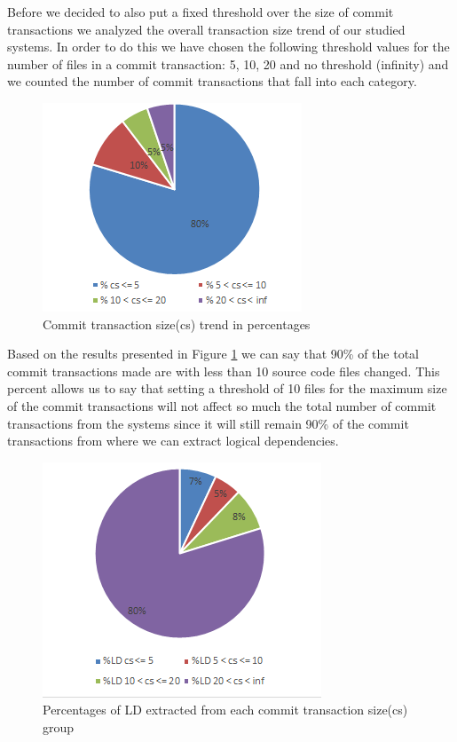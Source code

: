 \documentclass[conference]{IEEEtran}
\begin{document}
Before we decided to also put a fixed threshold over the size of commit transactions we analyzed the overall transaction size trend of our studied systems.
In order to do this we have chosen the following threshold values for the number of files in a commit transaction: 5, 10, 20 and no threshold (infinity) and we counted the number of commit transactions that fall into each category.


\begin{figure}[h]
\includegraphics[scale=0.9]{fig_cs.png}
\caption{Commit transaction size(cs) trend in percentages}
\label{fig:fig_cs}
\centering
\end{figure}


Based on the results presented in Figure \ref{fig:fig_cs} we can say that 90\% of the total commit transactions made are with less than 10 source code files changed. This percent allows us to say that setting a threshold of 10 files for the maximum size of the commit transactions will not affect so much the total number of commit transactions from the systems since it will still remain 90\% of the commit transactions from where we can extract logical dependencies.


\begin{figure}[h]
\includegraphics[scale=0.9]{fig_ld_ts.png}
\caption{Percentages of LD extracted from each commit transaction size(cs) group}
\label{fig:fig_ld_ts}
\centering
\end{figure}
\end{document}
